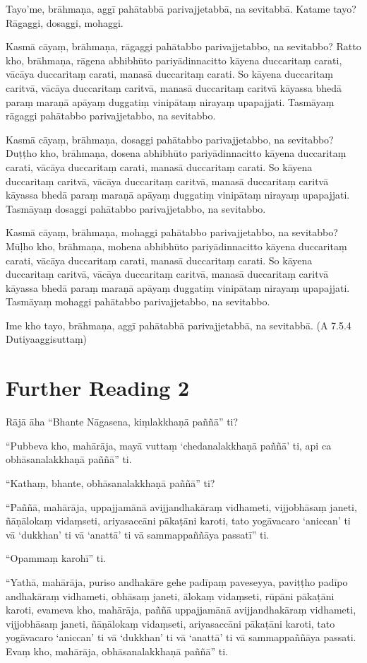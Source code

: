 Tayo’me, brāhmaṇa, aggī pahātabbā parivajjetabbā, na sevitabbā. Katame tayo? Rāgaggi, dosaggi, mohaggi.

Kasmā cāyaṃ, brāhmaṇa, rāgaggi pahātabbo parivajjetabbo, na sevitabbo? Ratto kho, brāhmaṇa, rāgena abhibhūto pariyādinnacitto kāyena duccaritaṃ carati, vācāya duccaritaṃ carati, manasā duccaritaṃ carati. So kāyena duccaritaṃ caritvā, vācāya duccaritaṃ caritvā, manasā duccaritaṃ caritvā kāyassa bhedā paraṃ maraṇā apāyaṃ duggatiṃ vinipātaṃ nirayaṃ upapajjati. Tasmāyaṃ rāgaggi pahātabbo parivajjetabbo, na sevitabbo.

Kasmā cāyaṃ, brāhmaṇa, dosaggi pahātabbo parivajjetabbo, na sevitabbo? Duṭṭho kho, brāhmaṇa, dosena abhibhūto pariyādinnacitto kāyena duccaritaṃ carati, vācāya duccaritaṃ carati, manasā duccaritaṃ carati. So kāyena duccaritaṃ caritvā, vācāya duccaritaṃ caritvā, manasā duccaritaṃ caritvā kāyassa bhedā paraṃ maraṇā apāyaṃ duggatiṃ vinipātaṃ nirayaṃ upapajjati. Tasmāyaṃ dosaggi pahātabbo parivajjetabbo, na sevitabbo.

Kasmā cāyaṃ, brāhmaṇa, mohaggi pahātabbo parivajjetabbo, na sevitabbo? Mūḷho kho, brāhmaṇa, mohena abhibhūto pariyādinnacitto kāyena duccaritaṃ carati, vācāya duccaritaṃ carati, manasā duccaritaṃ carati. So kāyena duccaritaṃ caritvā, vācāya duccaritaṃ caritvā, manasā duccaritaṃ caritvā kāyassa bhedā paraṃ maraṇā apāyaṃ duggatiṃ vinipātaṃ nirayaṃ upapajjati. Tasmāyaṃ mohaggi pahātabbo parivajjetabbo, na sevitabbo.

Ime kho tayo, brāhmaṇa, aggī pahātabbā parivajjetabbā, na sevitabbā. \hfill(A 7.5.4 Dutiyaaggisuttaṃ)

\section*{Further Reading 2}

Rājā āha “Bhante Nāgasena, kiṃlakkhaṇā paññā” ti?

“Pubbeva kho, mahārāja, mayā vuttaṃ ‘chedanalakkhaṇā paññā’ ti, api ca obhāsanalakkhaṇā paññā” ti.

“Kathaṃ, bhante, obhāsanalakkhaṇā paññā” ti?

“Paññā, mahārāja, uppajjamānā avijjandhakāraṃ vidhameti, vijjobhāsaṃ janeti, ñāṇālokaṃ vidaṃseti, ariyasaccāni pākaṭāni karoti, tato yogāvacaro ‘aniccan’ ti vā ‘dukkhan’ ti vā ‘anattā’ ti vā sammappaññāya passatī” ti.

“Opammaṃ karohī” ti.

“Yathā, mahārāja, puriso andhakāre gehe padīpaṃ paveseyya, paviṭṭho padīpo andhakāraṃ vidhameti, obhāsaṃ janeti, ālokaṃ vidaṃseti, rūpāni pākaṭāni karoti, evameva kho, mahārāja, paññā uppajjamānā avijjandhakāraṃ vidhameti, vijjobhāsaṃ janeti, ñāṇālokaṃ vidaṃseti, ariyasaccāni pākaṭāni karoti, tato yogāvacaro ‘aniccan’ ti vā ‘dukkhan’ ti vā ‘anattā’ ti vā sammappaññāya passati. Evaṃ kho, mahārāja, obhāsanalakkhaṇā paññā” ti.

